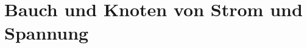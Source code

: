 
\section{Bauch und Knoten von Strom und Spannung}
\label{section:bauch_knoten}
\begin{frame}%
\end{frame}%
